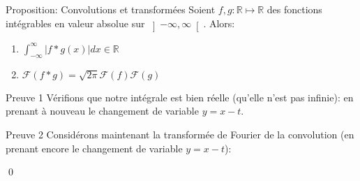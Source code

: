 \documentclass[a4paper]{article}
\begin{document}
\begin{parag}{Proposition: Convolutions et transformées}
    Soient $f, g: \mathbb{R} \mapsto \mathbb{R}$ des fonctions intégrables en valeur absolue sur $\left]-\infty, \infty\right[ $. Alors:
    \begin{enumerate}
        \item $\displaystyle \int_{-\infty}^{\infty} \left|f * g\left(x\right)\right|dx \in \mathbb{R}$ 
        \item $\displaystyle \mathcal{F}\left(f * g\right) = \sqrt{2\pi} \mathcal{F}\left(f\right) \mathcal{F}\left(g\right)$
    \end{enumerate}

    \begin{subparag}{Preuve 1}
        Vérifions que notre intégrale est bien réelle (qu'elle n'est pas infinie): 
       en prenant à nouveau le changement de variable $y = x - t$.
    \end{subparag}

    \begin{subparag}{Preuve 2}
        Considérons maintenant la transformée de Fourier de la convolution (en prenant encore le changement de variable $y = x - t$): 

        \qed
    \end{subparag}
\end{parag}
\end{document}
